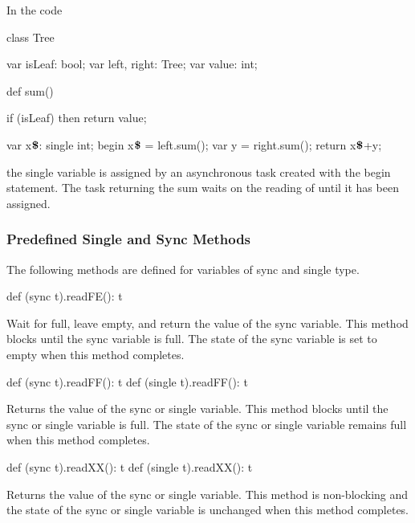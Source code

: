 \begin{example}
In the code
\begin{chapel}
class Tree {
  var isLeaf: bool;
  var left, right: Tree;
  var value: int;

  def sum() {
    if (isLeaf) then 
       return value;

    var x$\mbox{{\bf \$}}$: single int;
    begin x$\mbox{{\bf \$}}$ = left.sum();
    var y = right.sum();
    return x$\mbox{{\bf \$}}$+y;
  }
}
\end{chapel}
the single variable  is assigned by an
asynchronous task created with the begin statement.  The task
returning the sum waits on the reading of 
until it has been assigned.
\end{example}

\subsubsection{Predefined Single and Sync Methods}
\label{Functions_on_Synchronization_Variables}

The following methods are defined for variables of sync and single
type.

\begin{protohead}
def (sync t).readFE(): t
\end{protohead}
\begin{protobody}
Wait for full, leave empty, and return the value of the sync variable.
This method blocks until the sync variable is full.  The state of the
sync variable is set to empty when this method completes.
\end{protobody}

\begin{protohead}
def (sync t).readFF(): t
def (single t).readFF(): t
\end{protohead}
\begin{protobody}
Returns the value of the sync or single variable.  This method blocks
until the sync or single variable is full.  The state of the sync or
single variable remains full when this method completes.
\end{protobody}

\begin{protohead}
def (sync t).readXX(): t
def (single t).readXX(): t
\end{protohead}
\begin{protobody}
Returns the value of the sync or single variable.  This method is non-blocking
and the state of the sync or single variable is unchanged when this method
completes.
\end{protobody}

